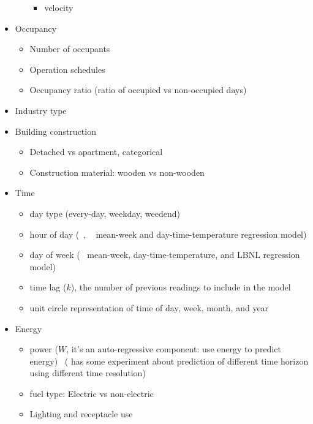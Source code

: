 \documentclass[12pt]{article}
\begin{document}
\begin{itemize}
\begin{itemize}
\begin{itemize}
    \item velocity~\cite{brown2012kernel}
    \end{itemize}
  \end{itemize}
\item Occupancy
  \begin{itemize}
  \item Number of occupants~\cite{Yu20101637}
  \item Operation schedules~\cite{reddy1997baselining}
  \item Occupancy ratio (ratio of occupied vs non-occupied days)~\cite{rabl1992energy}
  \end{itemize}
\item Industry type
\item Building construction
  \begin{itemize}
  \item Detached vs apartment, categorical~\cite{Yu20101637}
  \item Construction material: wooden vs non-wooden~\cite{Yu20101637}
  \end{itemize}
\item Time
  \begin{itemize}
  \item day type (every-day, weekday, weedend)~\cite{haberl1994bin}
  \item hour of day (~\cite{haberl1994bin, wytock2013contextually},
    ~\cite{granderson2014evaluation} mean-week and
    day-time-temperature regression model)
  \item day of week (~\cite{granderson2014evaluation} mean-week, 
    day-time-temperature, and LBNL regression model)
  \item time lag ($k$), the number of previous readings to include in the model~\cite{hammarsten1987critical}
  \item unit circle representation of time of day, week, month, and year~\cite{brown2012kernel}
  \end{itemize}
\item Energy
  \begin{itemize}
  \item power ($W$, it's an auto-regressive component: use energy to
    predict energy)
    ~\cite{hammarsten1987critical, case2012saving}(\cite{mocanu2016deep} has some
    experiment about prediction of different time horizon using
    different time resolution)
  \item fuel type: Electric vs non-electric ~\cite{Yu20101637}
  \item Lighting and receptacle use~\cite{kissock1994modeling}

\end{itemize}
\end{itemize}
\end{document}
